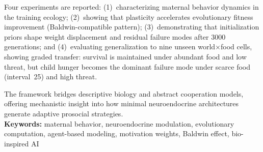 Four experiments are reported:
(1)~characterizing maternal behavior dynamics in the training ecology;
(2)~showing that plasticity accelerates evolutionary fitness improvement (Baldwin-compatible pattern);
(3)~demonstrating that initialization priors shape weight displacement and residual failure modes after 3000 generations; and
(4)~evaluating generalization to nine unseen world$\times$food cells, showing graded transfer: survival is maintained under abundant food and low threat, but child hunger becomes the dominant failure mode under scarce food (interval~25) and high threat.

The framework bridges descriptive biology and abstract cooperation models, offering mechanistic insight into how minimal neuroendocrine architectures generate adaptive prosocial strategies.\\

\noindent \textbf{Keywords:} maternal behavior, neuroendocrine modulation, evolutionary computation, agent-based modeling, motivation weights, Baldwin effect, bio-inspired AI

